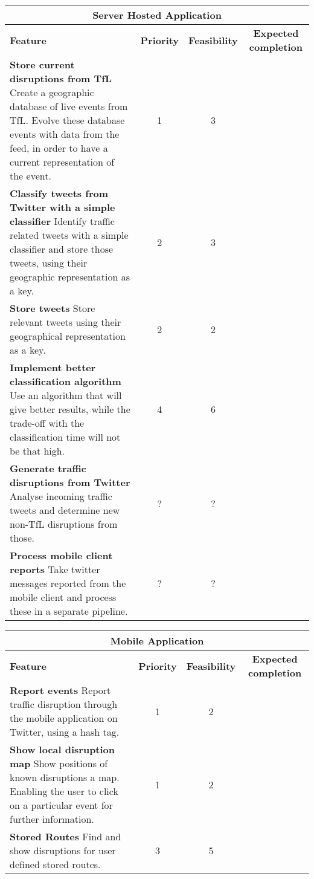 \begin{center}
\begin{tabular}{ | p{6cm} | c | c | c | }
\hline
\multicolumn{4}{|c|}{\textbf{Server Hosted Application}} \\ \hline
\textbf{Feature} & \textbf{Priority} & \textbf{Feasibility} & \textbf{Expected completion} \\ \hline
\textbf{Store current disruptions from TfL} \newline
Create a geographic database of live events from TfL. Evolve these database events with data from the feed, in order to have a current representation of the event. & 1 & 3 & \\ \hline
\textbf{Classify tweets from Twitter with a simple classifier}
Identify traffic related tweets with a simple classifier and store those tweets, using their geographic representation as a key. & 2 & 3 & \\ \hline
\textbf{Store tweets} \newline
Store relevant tweets using their geographical representation as a key. & 2 & 2 & \\ \hline
\textbf{Implement better classification algorithm} \newline
Use an algorithm that will give better results, while the trade-off with the classification time will not be that high. & 4 & 6 & \\ \hline
\textbf{Generate traffic disruptions from Twitter} \newline
Analyse incoming traffic tweets and determine new non-TfL disruptions from those. & ? & ? & \\ \hline
\textbf{Process mobile client reports} \newline
Take twitter messages reported from the mobile client and process these in a separate pipeline. & ? & ? & \\ \hline
\end{tabular}
\end{center}

\begin{center}
\begin{tabular}{ | p{6cm} | c | c | c | }
\hline
\multicolumn{4}{|c|}{\textbf{Mobile Application}} \\ \hline
\textbf{Feature} & \textbf{Priority} & \textbf{Feasibility} & \textbf{Expected completion} \\ \hline
\textbf{Report events}
Report traffic disruption through the mobile application on Twitter, using a hash tag. & 1 & 2 & \\ \hline
\textbf{Show local disruption map}
Show positions of known disruptions a map. Enabling the user to click on a particular event for further information. & 1 & 2 & \\ \hline
\textbf{Stored Routes}
Find and show disruptions for user defined stored routes. & 3 & 5 & \\ \hline
\end{tabular}
\end{center}